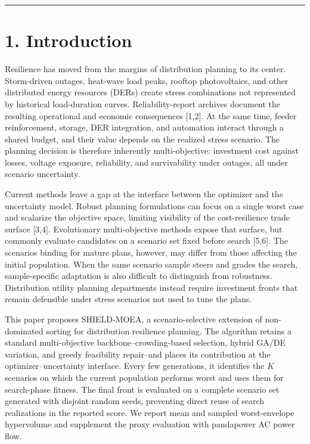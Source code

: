 \documentclass[
  10pt,
  a4paper,
]{article}
\begin{document}
\begin{center}\rule{0.5\linewidth}{0.5pt}\end{center}

\section{1. Introduction}\label{introduction}

Resilience has moved from the margins of distribution planning to its
center. Storm-driven outages, heat-wave load peaks, rooftop
photovoltaics, and other distributed energy resources (DERs) create
stress combinations not represented by historical load-duration curves.
Reliability-report archives document the resulting operational and
economic consequences {[}1,2{]}. At the same time, feeder reinforcement,
storage, DER integration, and automation interact through a shared
budget, and their value depends on the realized stress scenario. The
planning decision is therefore inherently multi-objective: investment
cost against losses, voltage exposure, reliability, and survivability
under outages, all under scenario uncertainty.

Current methods leave a gap at the interface between the optimizer and
the uncertainty model. Robust planning formulations can focus on a
single worst case and scalarize the objective space, limiting visibility
of the cost-resilience trade surface {[}3,4{]}. Evolutionary
multi-objective methods expose that surface, but commonly evaluate
candidates on a scenario set fixed before search {[}5,6{]}. The
scenarios binding for mature plans, however, may differ from those
affecting the initial population. When the same scenario sample steers
and grades the search, sample-specific adaptation is also difficult to
distinguish from robustness. Distribution utility planning departments
instead require investment fronts that remain defensible under stress
scenarios not used to tune the plans.

This paper proposes SHIELD-MOEA, a scenario-selective extension of
non-dominated sorting for distribution resilience planning. The
algorithm retains a standard multi-objective backbone--crowding-based
selection, hybrid GA/DE variation, and greedy feasibility repair--and
places its contribution at the optimizer--uncertainty interface. Every
few generations, it identifies the \(K\) scenarios on which the current
population performs worst and uses them for search-phase fitness. The
final front is evaluated on a complete scenario set generated with
disjoint random seeds, preventing direct reuse of search realizations in
the reported score. We report mean and sampled worst-envelope
hypervolume and supplement the proxy evaluation with pandapower AC power
flow.
\end{document}
